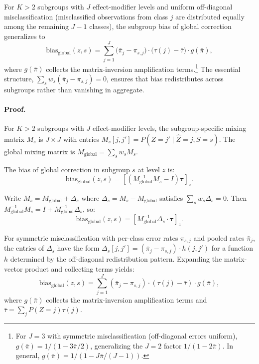 \begin{corollary}
\label{cor:multiclass}
For $K > 2$ subgroups with $J$ effect-modifier levels and uniform off-diagonal misclassification (misclassified observations from class $j$ are distributed equally among the remaining $J{-}1$ classes), the subgroup bias of global correction generalizes to
\begin{equation}
\mathrm{bias}_{\mathrm{global}}(z, s) = \sum_{j=1}^{J} \bigl(\bar{\pi}_j - \pi_{s,j}\bigr) \cdot \bigl(\tau(j) - \bar{\tau}\bigr) \cdot g(\bar{\pi}),
\label{eq:multiclass}
\end{equation}
where $g(\bar{\pi})$ collects the matrix-inversion amplification terms.\footnote{For $J=3$ with symmetric misclassification (off-diagonal errors uniform), $g(\bar{\pi}) = 1/(1 - 3\bar{\pi}/2)$, generalizing the $J{=}2$ factor $1/(1-2\bar{\pi})$. In general, $g(\bar{\pi}) = 1/(1 - J\bar{\pi}/(J-1))$.}
The essential structure, $\sum_s w_s (\bar{\pi}_j - \pi_{s,j}) = 0$, ensures that bias redistributes across subgroups rather than vanishing in aggregate.
\end{corollary}

\paragraph{Proof.}
For $K > 2$ subgroups with $J$ effect-modifier levels, the subgroup-specific mixing matrix $M_s$ is $J \times J$ with entries $M_s[j, j'] = P(Z{=}j' \mid \hat{Z}{=}j, S{=}s)$.
The global mixing matrix is $M_{\text{global}} = \sum_s w_s M_s$.

The bias of global correction in subgroup $s$ at level $z$ is:
\begin{equation}
\text{bias}_{\text{global}}(z, s) = [(M_{\text{global}}^{-1} M_s - I) \boldsymbol{\tau}]_z.
\end{equation}

Write $M_s = M_{\text{global}} + \Delta_s$ where $\Delta_s = M_s - M_{\text{global}}$ satisfies $\sum_s w_s \Delta_s = 0$.
Then $M_{\text{global}}^{-1} M_s = I + M_{\text{global}}^{-1} \Delta_s$, so:
\begin{equation}
\text{bias}_{\text{global}}(z, s) = [M_{\text{global}}^{-1} \Delta_s \cdot \boldsymbol{\tau}]_z.
\end{equation}

For symmetric misclassification with per-class error rates $\pi_{s,j}$ and pooled rates $\bar{\pi}_j$, the entries of $\Delta_s$ have the form $\Delta_s[j,j'] = (\bar{\pi}_j - \pi_{s,j}) \cdot h(j, j')$ for a function $h$ determined by the off-diagonal redistribution pattern.
Expanding the matrix-vector product and collecting terms yields:
\begin{equation}
\text{bias}_{\text{global}}(z, s) = \sum_{j=1}^{J} (\bar{\pi}_j - \pi_{s,j}) \cdot (\tau(j) - \bar{\tau}) \cdot g(\bar{\pi}),
\end{equation}
where $g(\bar{\pi})$ collects the matrix-inversion amplification terms and $\bar{\tau} = \sum_j P(Z{=}j) \tau(j)$.

